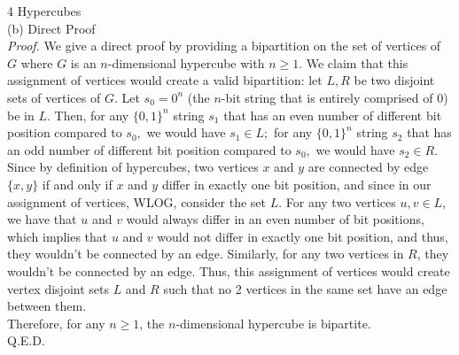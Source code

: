 \documentclass{article}
\begin{document}
{\Large 4 Hypercubes} \\[.5cm]
(b) Direct Proof \\[.3cm]
\indent \textit{Proof.} We give a direct proof by providing a bipartition on the set of vertices of $G$ where $G$ is an $n$-dimensional hypercube with $n\geq1.$ We claim that this assignment of vertices would create a valid bipartition: let $L,R$ be two disjoint sets of vertices of $G.$ Let $s_0 = 0^n$ (the $n$-bit string that is entirely comprised of 0) be in $L.$ Then, for any $\{0,1\}^n$ string $s_1$ that has an even number of different bit position compared to $s_0,$ we would have $s_1\in L;$ for any $\{0,1\}^n$ string $s_2$ that has an odd number of different bit position compared to $s_0,$ we would have $s_2\in R.$ \\[.3cm]
\indent Since by definition of hypercubes, two vertices $x$ and $y$ are connected by edge $\{x, y\}$ if and only if $x$ and $y$ differ in exactly one bit position, and since in our assignment of vertices, WLOG, consider the set $L.$ For any two vertices $u,v\in L,$ we have that $u$ and $v$ would always differ in an even number of bit positions, which implies that $u$ and $v$ would not differ in exactly one bit position, and thus, they wouldn't be connected by an edge. Similarly, for any two vertices in $R$, they wouldn't be connected by an edge. Thus, this assignment of vertices would create vertex disjoint sets $L$ and $R$ such that no 2 vertices in the same set have an edge between them. \\[.3cm]
Therefore, for any $n\geq1$, the $n$-dimensional hypercube is bipartite.\\[.3cm]
Q.E.D.
\end{document}
